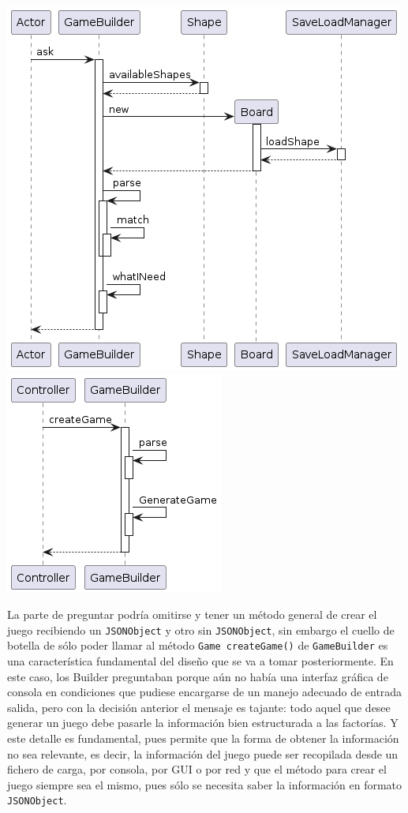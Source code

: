 \documentclass[../DocumentoOficial.tex]{subfiles}
\begin{document}
\begin{sprint}[4]
\begin{center}
\includegraphics[scale=0.5]{Builders_sprint4_seq}
\includegraphics[scale=0.5]{Builders2_sprint4_seq}
\end{center}

La parte de preguntar podría omitirse y tener un método general de crear el juego recibiendo un \texttt{JSONObject} y otro sin \texttt{JSONObject}, sin embargo el cuello de botella de sólo poder llamar al método \texttt{Game createGame()} de \texttt{GameBuilder} es una característica fundamental del diseño que se va a tomar posteriormente. En este caso, los Builder preguntaban porque aún no había una interfaz gráfica de consola en condiciones que pudiese encargarse de un manejo adecuado de entrada salida, pero con la decisión anterior el mensaje es tajante: todo aquel que desee generar un juego debe pasarle la información bien estructurada a las factorías. Y este detalle es fundamental, pues permite que la forma de obtener la información no sea relevante, es decir, la información del juego puede ser recopilada desde un fichero de carga, por consola, por GUI o por red y que el método para crear el juego siempre sea el mismo, pues sólo se necesita saber la información en formato \texttt{JSONObject}.
\end{sprint}
\end{document}
